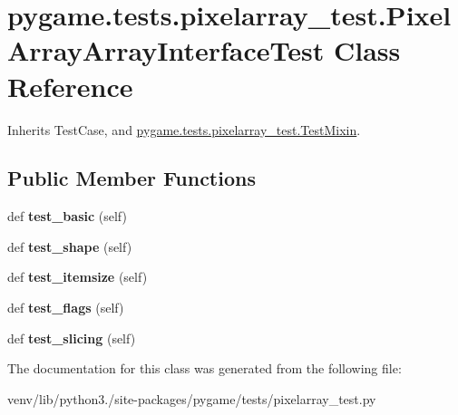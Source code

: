 \hypertarget{classpygame_1_1tests_1_1pixelarray__test_1_1_pixel_array_array_interface_test}{}\section{pygame.\+tests.\+pixelarray\+\_\+test.\+Pixel\+Array\+Array\+Interface\+Test Class Reference}
\label{classpygame_1_1tests_1_1pixelarray__test_1_1_pixel_array_array_interface_test}


Inherits Test\+Case, and \hyperlink{classpygame_1_1tests_1_1pixelarray__test_1_1_test_mixin}{pygame.\+tests.\+pixelarray\+\_\+test.\+Test\+Mixin}.

\subsection*{Public Member Functions}
\begin{DoxyCompactItemize}
\item 
\mbox{\label{classpygame_1_1tests_1_1pixelarray__test_1_1_pixel_array_array_interface_test_a269bcac24419f11b92723175be212c4f}} 
def {\bfseries test\+\_\+basic} (self)
\item 
\mbox{\label{classpygame_1_1tests_1_1pixelarray__test_1_1_pixel_array_array_interface_test_ae9ba2a6f1a55c10b22977c03934529b9}} 
def {\bfseries test\+\_\+shape} (self)
\item 
\mbox{\label{classpygame_1_1tests_1_1pixelarray__test_1_1_pixel_array_array_interface_test_a433284d7d7e819bba5a4f2133a0bd34f}} 
def {\bfseries test\+\_\+itemsize} (self)
\item 
\mbox{\label{classpygame_1_1tests_1_1pixelarray__test_1_1_pixel_array_array_interface_test_a810dd48e0539d6dac7d7e15076edb645}} 
def {\bfseries test\+\_\+flags} (self)
\item 
\mbox{\label{classpygame_1_1tests_1_1pixelarray__test_1_1_pixel_array_array_interface_test_ac13e0b5f89fa4590964a4e61b3148435}} 
def {\bfseries test\+\_\+slicing} (self)
\end{DoxyCompactItemize}


The documentation for this class was generated from the following file\+:\begin{DoxyCompactItemize}
\item 
venv/lib/python3./site-\/packages/pygame/tests/pixelarray\+\_\+test.\+py\end{DoxyCompactItemize}
